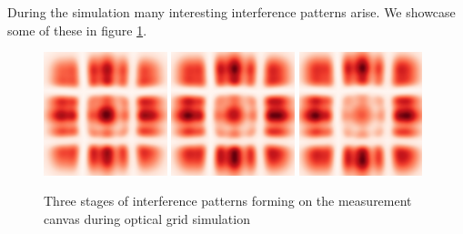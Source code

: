 During the simulation many interesting interference patterns arise.
We showcase some of these in figure \ref{fig:optical_grid_interference}.
\begin{figure}
	\begin{center}
		\includegraphics[width=0.32\textwidth]{figures/optical_grid_interference_01.png}
		\includegraphics[width=0.32\textwidth]{figures/optical_grid_interference_02.png}
		\includegraphics[width=0.32\textwidth]{figures/optical_grid_interference_03.png}
		\caption{Three stages of interference patterns forming on the measurement canvas during optical grid simulation}
		\label{fig:optical_grid_interference}
	\end{center}	
\end{figure}

